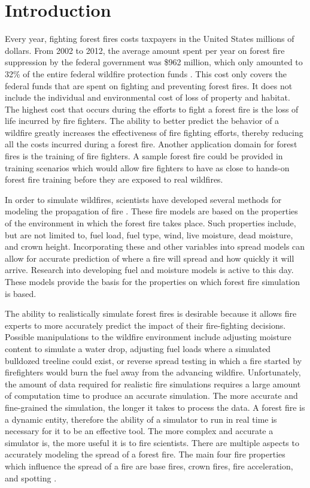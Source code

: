 \chapter{Introduction}

Every year, fighting forest fires costs taxpayers in the United States millions of dollars. From 2002 to 2012, the average amount spent per year on forest fire suppression by the federal government was \$962 million, which only amounted to 32\% of the entire federal wildfire protection funds \cite{forestcost}. This cost only covers the federal funds that are spent on fighting and preventing forest fires. It does not include the individual and environmental cost of loss of property and habitat. The highest cost that occurs during the efforts to fight a forest fire is the loss of life incurred by fire fighters. The ability to better predict the behavior of a wildfire greatly increases the effectiveness of fire fighting efforts, thereby reducing all the costs incurred during a forest fire. Another application domain for forest fires is the training of fire fighters. A sample forest fire could be provided in training scenarios which would allow fire fighters to have as close to hands-on forest fire training before they are exposed to real wildfires. 

In order to simulate wildfires, scientists have developed several methods for modeling the propagation of fire \cite{roth,BEHAVE,1983roth}. These fire models are based on the properties of the environment in which the forest fire takes place. Such properties include, but are not limited to, fuel load, fuel type, wind, live moisture, dead moisture, and crown height. Incorporating these and other variables into spread models can allow for accurate prediction of where a fire will spread and how quickly it will arrive. Research into developing fuel and moisture models is active to this day. These models provide the basis for the properties on which forest fire simulation is based.

The ability to realistically simulate forest fires is desirable because it allows fire experts to more accurately predict the impact of their fire-fighting decisions. Possible manipulations to the wildfire environment include adjusting moisture content to simulate a water drop, adjusting fuel loads where a simulated bulldozed treeline could exist, or reverse spread testing in which a fire started by firefighters would burn the fuel away from the advancing wildfire. Unfortunately, the amount of data required for realistic fire simulations requires a large amount of computation time to produce an accurate simulation. The more accurate and fine-grained the simulation, the longer it takes to process the data. A forest fire is a dynamic entity, therefore the ability of a simulator to run in real time is necessary for it to be an effective tool. The more complex and accurate a simulator is, the more useful it is to fire scientists. There are multiple aspects to accurately modeling the spread of a forest fire. The main four fire properties which influence the spread of a fire are base fires, crown fires, fire acceleration, and spotting \cite{firereview}. 

